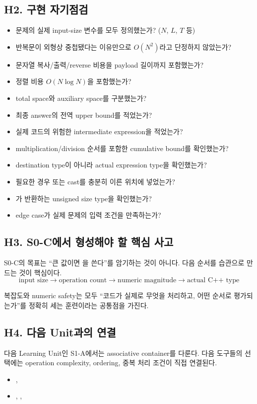 \subsection{H2. 구현 자기점검}
\begin{checklistbox}[S0-C 코드 작성 후 체크리스트]
\begin{itemize}
  \item[$\square$] 문제의 실제 input-size 변수를 모두 정의했는가? ($N$, $L$, $T$ 등)
  \item[$\square$] 반복문이 외형상 중첩됐다는 이유만으로 $O(N^2)$라고 단정하지 않았는가?
  \item[$\square$] 문자열 복사/출력/reverse 비용을 payload 길이까지 포함했는가?
  \item[$\square$] 정렬 비용 $O(N\log N)$을 포함했는가?
  \item[$\square$] total space와 auxiliary space를 구분했는가?
  \item[$\square$] 최종 answer의 전역 upper bound를 적었는가?
  \item[$\square$] 실제 코드의 위험한 intermediate expression을 적었는가?
  \item[$\square$] multiplication/division 순서를 포함한 cumulative bound를 확인했는가?
  \item[$\square$] destination type이 아니라 actual expression type을 확인했는가?
  \item[$\square$] 필요한 경우  또는 cast를 충분히 이른 위치에 넣었는가?
  \item[$\square$] 가 반환하는 unsigned size type을 확인했는가?
  \item[$\square$] edge case가 실제 문제의 입력 조건을 만족하는가?
\end{itemize}
\end{checklistbox}

\subsection{H3. S0-C에서 형성해야 할 핵심 사고}
S0-C의 목표는 ``큰 값이면 을 쓴다''를 암기하는 것이 아니다. 다음 순서를 습관으로 만드는 것이 핵심이다.
\[
\boxed{\text{input size} \to \text{operation count} \to \text{numeric magnitude} \to \text{actual C++ type}}
\]

복잡도와 numeric safety는 모두 ``코드가 실제로 무엇을 처리하고, 어떤 순서로 평가되는가''를 정확히 세는 훈련이라는 공통점을 가진다.

\subsection{H4. 다음 Unit과의 연결}
다음 Learning Unit인 S1-A에서는 associative container를 다룬다. 다음 도구들의 선택에는 operation complexity, ordering, 중복 처리 조건이 직접 연결된다.
\begin{itemize}
  \item {}, 
  \item {}, , 
\end{itemize}

